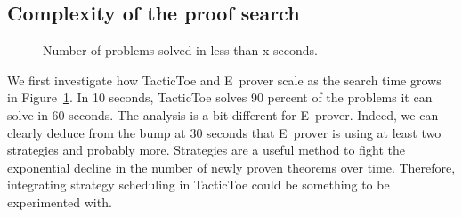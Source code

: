 \documentclass[runningheads,a4paper,draft]{svjour3}
\def\eprover{\textsf{E~prover}\xspace}
\def\tactictoe{\textsf{TacticToe}\xspace}
\begin{document}
\subsection{Complexity of the proof search}

\begin{figure}[h]
\centering
{}
\caption{\label{fig:c1} Number of problems solved in less than x seconds.}
\end{figure}

We first investigate how \tactictoe and \eprover scale as the search time
grows in Figure~\ref{fig:c1}.
In 10 seconds, \tactictoe solves 90 percent of the problems it can
solve in 60 seconds. The analysis is a bit different for \eprover. Indeed,
we can clearly deduce from the bump at 30 seconds that \eprover is using at
least two strategies and probably more. Strategies are a useful method to
fight the exponential decline in the number of newly proven theorems over
time. Therefore, integrating strategy scheduling in \tactictoe could be
something to be experimented with.

\end{document}
